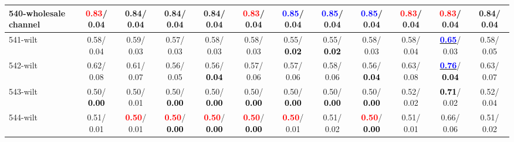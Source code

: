 \begin{table}[h]
\begin{center}
{\begin{tabular}{lc|c|c|c|c|c|c|c|c|c|c}
540-wholesale channel & \textcolor{red}{\textbf{  0.83}}/  0.04 &   0.84/  0.04 &   0.84/  0.04 &   0.84/  0.04 & \textcolor{red}{\textbf{  0.83}}/  0.04 & \textcolor{blue}{\textbf{  0.85}}/  0.04 & \textcolor{blue}{\textbf{  0.85}}/  0.04 & \textcolor{blue}{\textbf{  0.85}}/  0.04 & \textcolor{red}{\textbf{  0.83}}/  0.04 & \textcolor{red}{\textbf{  0.83}}/  0.04 &   0.84/  0.04 \\ \hline
541-wilt &   0.58/  0.04 &   0.59/  0.03 &   0.57/  0.03 &   0.58/  0.03 &   0.58/  0.03 &   0.55/\textcolor{black}{\textbf{  0.02}} &   0.55/\textcolor{black}{\textbf{  0.02}} &   0.58/  0.03 &   0.58/  0.04 & \underline{\textcolor{blue}{\textbf{  0.65}}}/  0.03 &   0.58/  0.05 \\
542-wilt &   0.62/  0.08 &   0.61/  0.07 &   0.56/  0.05 &   0.56/\textcolor{black}{\textbf{  0.04}} &   0.57/  0.06 &   0.57/  0.06 &   0.58/  0.06 &   0.56/\textcolor{black}{\textbf{  0.04}} &   0.63/  0.08 & \underline{\textcolor{blue}{\textbf{  0.76}}}/\textcolor{black}{\textbf{  0.04}} &   0.63/  0.07 \\
543-wilt &   0.50/\textcolor{black}{\textbf{  0.00}} &   0.50/  0.01 &   0.50/\textcolor{black}{\textbf{  0.00}} &   0.50/\textcolor{black}{\textbf{  0.00}} &   0.50/\textcolor{black}{\textbf{  0.00}} &   0.50/\textcolor{black}{\textbf{  0.00}} &   0.50/\textcolor{black}{\textbf{  0.00}} &   0.50/\textcolor{black}{\textbf{  0.00}} &   0.52/  0.02 & \textcolor{black}{\textbf{  0.71}}/  0.02 &   0.52/  0.04 \\
544-wilt &   0.51/  0.01 & \textcolor{red}{\textbf{  0.50}}/  0.01 & \textcolor{red}{\textbf{  0.50}}/\textcolor{black}{\textbf{  0.00}} & \textcolor{red}{\textbf{  0.50}}/\textcolor{black}{\textbf{  0.00}} & \textcolor{red}{\textbf{  0.50}}/\textcolor{black}{\textbf{  0.00}} & \textcolor{red}{\textbf{  0.50}}/  0.01 &   0.51/  0.02 & \textcolor{red}{\textbf{  0.50}}/\textcolor{black}{\textbf{  0.00}} &   0.51/  0.01 &   0.66/  0.06 &   0.51/  0.02 \\\end{tabular}}\label{stratsALCKappa16Allalla}
\end{center}
\end{table}
\clearpage
